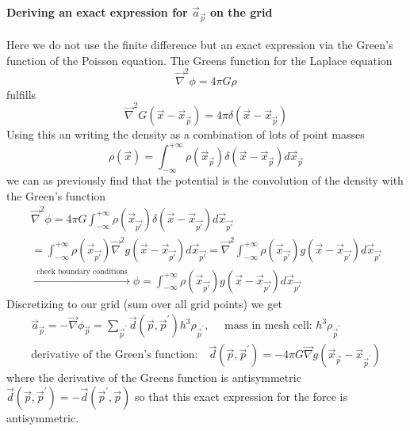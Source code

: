 \paragraph*{Deriving an exact expression for $\vec{a}_\vec{p}$ on the grid} Here we do not use the finite difference
but an exact expression via the Green's function of the Poisson equation. The Greens function for the Laplace
equation
\begin{equation}
    \vec{\nabla}^2 \phi = 4 \pi G \rho
\end{equation}
fulfills
\begin{equation}
    \vec{\nabla}^2 G(\vec{x} - \vec{x}_\vec{p}) = 4 \pi \delta(\vec{x} - \vec{x}_\vec{p})
\end{equation}
Using this an writing the density as a combination of lots of point masses
\begin{equation}
    \rho(\vec{x})=\int_{-\infty}^{+\infty} \rho\left(\vec{x}_{\vec{p}}\right) \delta\left(\vec{x}-\vec{x}_{\vec{p}}\right) d \vec{x}_{\vec{p}}
\end{equation}
we can as previously find that the potential
is the convolution of the density with the Green's function
\begin{equation}
    \begin{gathered}
    \vec{\nabla}^2 \phi=4 \pi G \int_{-\infty}^{+\infty} \rho\left(\vec{x}_{\vec{p'}}\right) \delta\left(\vec{x}-\vec{x}_{\vec{p'}}\right) d \vec{x}_{\vec{p'}} \\
    =\int_{-\infty}^{+\infty} \rho\left(\vec{x}_{\vec{p'}}\right) \vec{\nabla}^2 g\left(\vec{x}-\vec{x}_{\vec{p'}}\right) d \vec{x}_{\vec{p'}}=\vec{\nabla}^2 \int_{-\infty}^{+\infty} \rho\left(\vec{x}_{\vec{p'}}\right) g\left(\vec{x}-\vec{x}_{\vec{p'}}\right) d \vec{x}_{\vec{p'}} \\
    \xrightarrow{\text { check boundary conditions }} \phi=\int_{-\infty}^{+\infty} \rho\left(\vec{x}_\vec{p'}\right) g\left(\vec{x}-\vec{x}_{\vec{p'}}\right) d \vec{x}_\vec{p'}
    \end{gathered}
\end{equation}
Discretizing to our grid (sum over all grid points) we get
\begin{equation}
    \begin{gathered}
        \boxed{\vec{a}_{\vec{p}}=-\vec{\nabla} \phi_{\vec{p}}=\sum_{\vec{p}^{\prime}} \vec{d}\left(\vec{p}, \vec{p}^{\prime}\right) h^3 \rho_{\vec{p}^{\prime}}}, \quad \text { mass in mesh cell: } h^3 \rho_{\vec{p}^{\prime}} \\
        \text{derivative of the Green's function:} \quad \vec{d}\left(\vec{p}, \vec{p}^{\prime}\right)=-4 \pi G \vec{\nabla} g\left(\vec{x}_{\vec{p}}-\vec{x}_{\vec{p}^{\prime}}\right)
    \end{gathered}
\end{equation}
where the derivative of the Greens function is antisymmetric $\vec{d}(\vec{p},\vec{p}^\prime) = - \vec{d}(\vec{p}^\prime,\vec{p})$
so that this exact expression for the force is antisymmetric.

